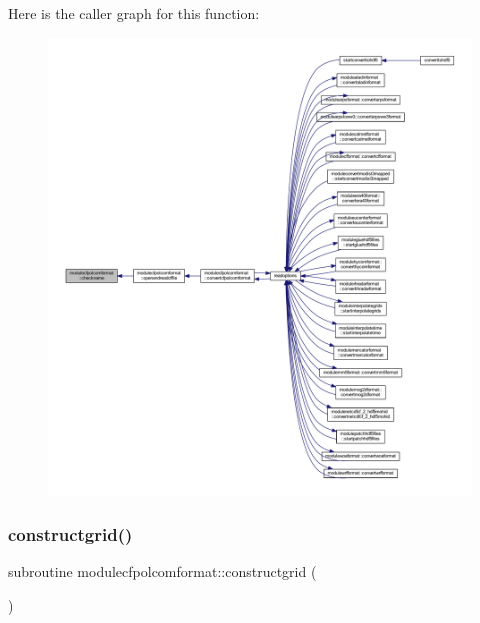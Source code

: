 Here is the caller graph for this function\+:\nopagebreak
\begin{figure}[H]
\begin{center}
\leavevmode
\includegraphics[width=350pt]{namespacemodulecfpolcomformat_a555e71ed3c48d8786288c63a8f0aa501_icgraph}
\end{center}
\end{figure}
\mbox{\label{namespacemodulecfpolcomformat_ae48cf997b8d44143cac43f824a76058d}} 
\subsubsection{\texorpdfstring{constructgrid()}{constructgrid()}}
{\footnotesize\ttfamily subroutine modulecfpolcomformat\+::constructgrid (\begin{DoxyParamCaption}{ }\end{DoxyParamCaption})\hspace{0.3cm}{\ttfamily [private]}}

